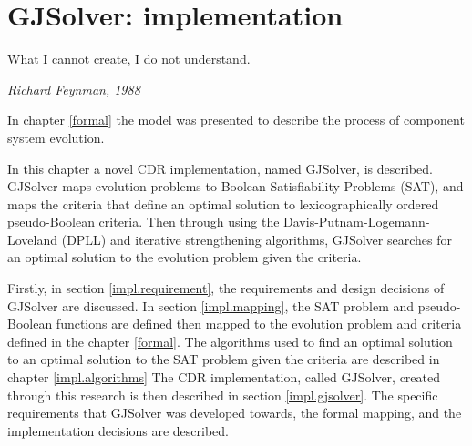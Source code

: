 \chapter{GJSolver: \modelname implementation}
\label{implementation}
\epigraph{What I cannot create, I do not understand.}
{\textit{Richard Feynman, 1988}}

In chapter \ref{formal} the model \modelname was presented to describe the process of component system evolution.


In this chapter a novel CDR implementation, named GJSolver, is described.
GJSolver maps evolution problems to Boolean Satisfiability Problems (SAT),
and maps the criteria that define an optimal solution to lexicographically ordered pseudo-Boolean \citep{dixon2004automating} criteria. 
Then through using the Davis-Putnam-Logemann-Loveland (DPLL) \citep{Davis1960, davis1962machine}
and iterative strengthening \citep{calistri1994iterative, le2010sat4j} algorithms,
GJSolver searches for an optimal solution to the evolution problem given the criteria.

Firstly, in section \ref{impl.requirement}, the requirements and design decisions of GJSolver are discussed.
In section \ref{impl.mapping}, the SAT problem and pseudo-Boolean functions are defined then mapped to the evolution problem and criteria defined in the chapter \ref{formal}.
The algorithms used to find an optimal solution to an optimal solution to the SAT problem given the criteria are described in chapter \ref{impl.algorithms}
The CDR implementation, called GJSolver, created through this research is then described in section \ref{impl.gjsolver}.
The specific requirements that GJSolver was developed towards, the formal mapping, and the implementation decisions are described.

